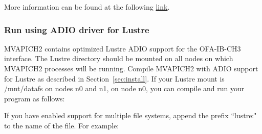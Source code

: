 More information can be found at the following \href{http://wiki.mcs.anl.gov/mpich2/index.php/Using_the_Hydra_Process_Manager#Hydra_with_Non-Ethernet_Networks}{link}.

\subsubsection{Run using ADIO driver for Lustre}
         MVAPICH2 contains optimized Lustre ADIO support for the
         OFA-IB-CH3 interface.
         The Lustre directory should be mounted on all nodes
         on which MVAPICH2 processes will be running.
         Compile MVAPICH2 with ADIO support for Lustre
         as described in Section~\ref{sec:install}.
         If your Lustre mount is /mnt/datafs on nodes n0 and n1,
         on node n0, you can compile and run your program as follows:



      If you have enabled support for multiple file systems,
      append the prefix ``lustre:" to the name of the file.
      For example:



